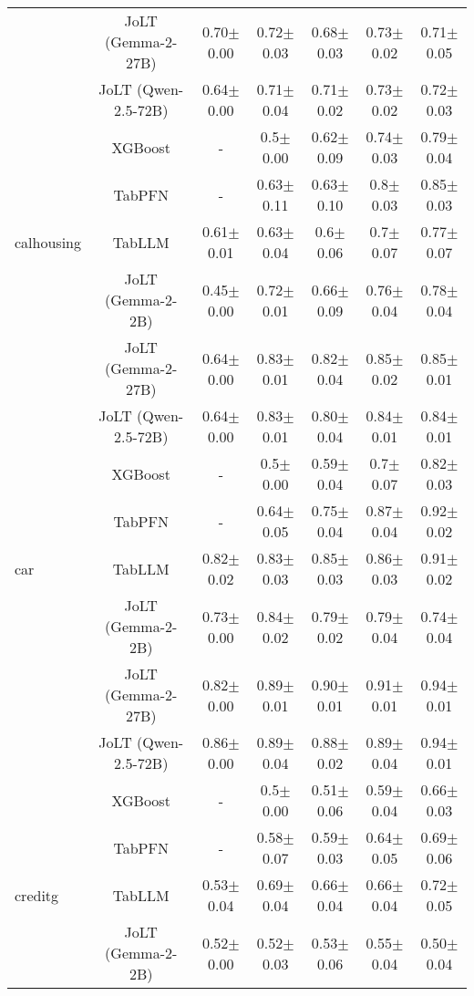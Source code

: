 \begin{table*}[htbp]
\begin{small}
\begin{sc}
\begin{adjustbox}{max width=\textwidth}
\begin{tabular}{rcccccc}
          & JoLT (Gemma-2-27B) & 0.70$\pm$0.00 & 0.72$\pm$0.03 & 0.68$\pm$0.03 & 0.73$\pm$0.02 & 0.71$\pm$0.05 \\
          & JoLT (Qwen-2.5-72B) & 0.64$\pm$0.00 & 0.71$\pm$0.04 & 0.71$\pm$0.02 & 0.73$\pm$0.02 & 0.72$\pm$0.03 \\
    \midrule
          & XGBoost & -     & 0.5$\pm$0.00 & 0.62$\pm$0.09 & 0.74$\pm$0.03 & 0.79$\pm$0.04 \\
          & TabPFN & -     & 0.63$\pm$0.11 & 0.63$\pm$0.10 & 0.8$\pm$0.03 & 0.85$\pm$0.03 \\
    \multicolumn{1}{l}{calhousing} & TabLLM & 0.61$\pm$0.01 & 0.63$\pm$0.04 & 0.6$\pm$0.06 & 0.7$\pm$0.07 & 0.77$\pm$0.07 \\
          & JoLT (Gemma-2-2B) & 0.45$\pm$0.00 & 0.72$\pm$0.01 & 0.66$\pm$0.09 & 0.76$\pm$0.04 & 0.78$\pm$0.04 \\
          & JoLT (Gemma-2-27B) & 0.64$\pm$0.00 & 0.83$\pm$0.01 & 0.82$\pm$0.04 & 0.85$\pm$0.02 & 0.85$\pm$0.01 \\
          & JoLT (Qwen-2.5-72B) & 0.64$\pm$0.00 & 0.83$\pm$0.01 & 0.80$\pm$0.04 & 0.84$\pm$0.01 & 0.84$\pm$0.01 \\
    \midrule
          & XGBoost & -     & 0.5$\pm$0.00 & 0.59$\pm$0.04 & 0.7$\pm$0.07 & 0.82$\pm$0.03 \\
          & TabPFN & -     & 0.64$\pm$0.05 & 0.75$\pm$0.04 & 0.87$\pm$0.04 & 0.92$\pm$0.02 \\
    \multicolumn{1}{l}{car} & TabLLM & 0.82$\pm$0.02 & 0.83$\pm$0.03 & 0.85$\pm$0.03 & 0.86$\pm$0.03 & 0.91$\pm$0.02 \\
          & JoLT (Gemma-2-2B) & 0.73$\pm$0.00 & 0.84$\pm$0.02 & 0.79$\pm$0.02 & 0.79$\pm$0.04 & 0.74$\pm$0.04 \\
          & JoLT (Gemma-2-27B) & 0.82$\pm$0.00 & 0.89$\pm$0.01 & 0.90$\pm$0.01 & 0.91$\pm$0.01 & 0.94$\pm$0.01 \\
          & JoLT (Qwen-2.5-72B) & 0.86$\pm$0.00 & 0.89$\pm$0.04 & 0.88$\pm$0.02 & 0.89$\pm$0.04 & 0.94$\pm$0.01 \\
    \midrule
          & XGBoost & -     & 0.5$\pm$0.00 & 0.51$\pm$0.06 & 0.59$\pm$0.04 & 0.66$\pm$0.03 \\
          & TabPFN & -     & 0.58$\pm$0.07 & 0.59$\pm$0.03 & 0.64$\pm$0.05 & 0.69$\pm$0.06 \\
    \multicolumn{1}{l}{creditg} & TabLLM & 0.53$\pm$0.04 & 0.69$\pm$0.04 & 0.66$\pm$0.04 & 0.66$\pm$0.04 & 0.72$\pm$0.05 \\
          & JoLT (Gemma-2-2B) & 0.52$\pm$0.00 & 0.52$\pm$0.03 & 0.53$\pm$0.06 & 0.55$\pm$0.04 & 0.50$\pm$0.04 \\

\end{tabular}
\end{adjustbox}
\end{sc}
\end{small}
\end{table*}
